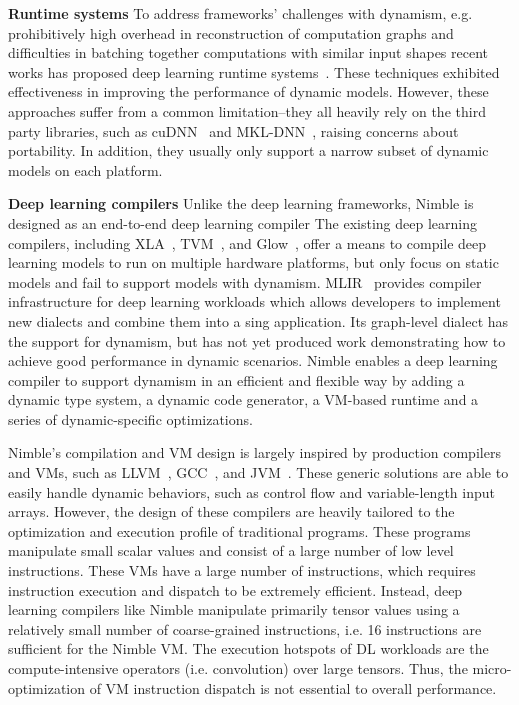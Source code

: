 \noindent
{\bf Runtime systems} To address frameworks' challenges with dynamism, e.g. prohibitively high overhead in reconstruction of computation graphs and difficulties in batching together computations with similar input shapes recent works has proposed deep learning runtime systems~\citep{xu2018cavs, gao2018low}. These techniques exhibited effectiveness in improving the performance of dynamic models. However, these approaches suffer from a common limitation--they all heavily rely on the third party libraries, such as cuDNN~\citep{cudnn} and MKL-DNN~\citep{mkldnn}, raising concerns about portability. In addition, they usually only support a narrow subset of dynamic models on each platform.

\noindent
{\bf Deep learning compilers} Unlike the deep learning frameworks, Nimble is designed as an end-to-end deep learning compiler The existing deep learning compilers, including XLA~\citep{xla}, TVM~\citep{tvm_osdi18}, and Glow~\citep{glow}, offer a means to compile deep learning models to run on multiple hardware platforms, but only focus on static models and fail to support models with dynamism.
MLIR~\citep{lattner2020mlir} provides compiler infrastructure for deep learning workloads which allows developers to implement new dialects and combine them into a sing application. Its graph-level dialect has the support for dynamism, but has not yet produced work demonstrating how to achieve good performance in dynamic scenarios.
Nimble enables a deep learning compiler to support dynamism in an efficient and flexible way by adding a dynamic type system, a dynamic code generator, a VM-based runtime and a series of dynamic-specific optimizations.

Nimble's compilation and VM design is largely inspired by production compilers and VMs, such as LLVM~\citep{llvm}, GCC~\citep{gcc}, and JVM~\citep{jvm}. These generic solutions are able to easily handle dynamic behaviors, such as control flow and variable-length input arrays. However, the design of these compilers are heavily tailored to the optimization and execution profile of traditional programs. These programs manipulate small scalar values and consist of a large number of low level instructions. These VMs have a large number of instructions, which requires instruction execution and dispatch to be extremely efficient. Instead, deep learning compilers like Nimble manipulate primarily tensor values using a relatively small number of coarse-grained instructions, i.e. 16 instructions are sufficient for the Nimble VM. The execution hotspots of DL workloads are the compute-intensive operators (i.e. convolution) over large tensors. Thus, the micro-optimization of VM instruction dispatch is not essential to overall performance.

